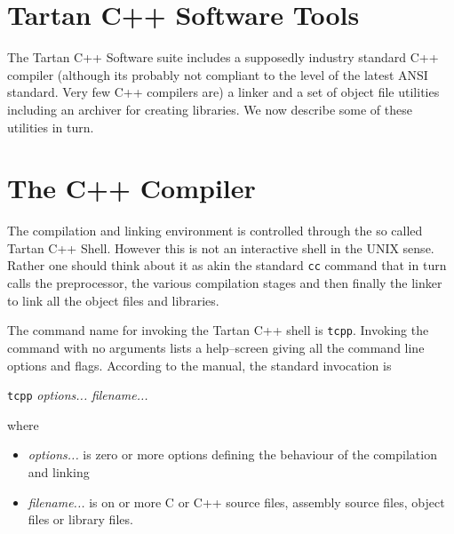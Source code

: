 \section{Tartan C++ Software Tools}
The Tartan C++ Software suite includes a supposedly industry standard C++
compiler (although its probably not compliant to the level of the latest 
ANSI standard. Very few C++ compilers are) a linker and a set of object file
utilities including an archiver for creating libraries. We now describe 
some of these utilities in turn.

\section{The C++ Compiler}
The compilation and linking environment is controlled through the so
called Tartan C++ Shell. However this is not an interactive shell in the 
UNIX sense. Rather one should think about it as akin the standard {\tt cc} 
command that in turn calls the preprocessor, the various compilation 
stages and then finally the linker to link all the object files and libraries.

The command name for invoking the Tartan C++ shell is {\tt tcpp}. Invoking
the command with no arguments lists a help--screen giving all the command
line options and flags. According to the manual, the standard invocation is
\begin{center}
{\tt tcpp} {\em options... } {\em filename... }
\end{center}
where
\begin{itemize}
\item
{\em options...} is zero or more options defining the behaviour of the
compilation and linking 
\item
{\em filename...} is on or more C or C++ source files, assembly source files, object files or library files.
\end{itemize} 

